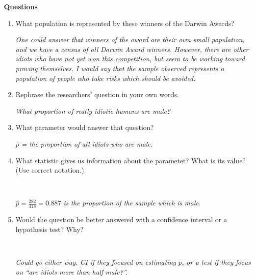 \begin{center}
  {\large\bf Questions} 
\end{center}
\begin{enumerate}
\item What population is  represented by these winners of the
     Darwin Awards?
\begin{students}
    \vspace*{5cm}    
\end{students}
\begin{key}
  {\it One could answer that winners of the award are their own small
    population, and we have a census of all Darwin Award
    winners. However, there are other idiots who have not yet won this
    competition, but seem to be working toward proving themselves. I
    would say that the sample observed represents a population of people who
    take risks which should be avoided.} 
\end{key}
\item Rephrase the researchers' question in your own words.
\begin{students}
    \vspace{2cm}    
\end{students}
\begin{key}
  {\it What proportion of really idiotic humans are male?} 
\end{key}

\item What parameter would answer that question?
\begin{students}
    \vspace{1cm}    
\end{students}
\begin{key} 
  {\it $p$ = the proportion of all idiots who are male.}
\end{key}
\item What statistic gives us information about the parameter?  What
  is its value? (Use correct notation.)
\begin{students}
    \vspace*{2cm}    \\
\end{students}
\begin{key} 
   { $\widehat{p} = \frac{282}{318} = 0.887$ \it is the
    proportion of the sample which is male.}
\end{key}

\item Would the question be better answered with a confidence interval
  or a hypothesis test? Why?
\begin{students}
    \vspace*{2cm}    \\
\end{students}
\begin{key} 
   {\it  Could go either way. CI if they focused on estimating $p$,
     or a test if they focus on ``are idiots more than half male?''.}
\end{key}

\end{enumerate}
